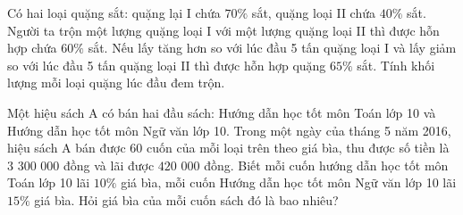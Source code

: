 \begin{bt}
	Có hai loại quặng sắt: quặng lại I chứa $70\%$ sắt, quặng loại II chứa $40\%$ sắt. Người ta trộn một lượng quặng loại I với một lượng quặng loại II thì được hỗn hợp chứa $60\%$ sắt. Nếu lấy tăng hơn so với lúc đầu 5 tấn quặng loại I và lấy giảm so với lúc đầu 5 tấn quặng loại II thì được hỗn hợp quặng $65\%$ sắt. Tính khối lượng mỗi loại quặng lúc đầu đem trộn.
\end{bt}

\begin{bt}%
Một hiệu sách A có bán hai đầu sách: Hướng dẫn học tốt môn Toán lớp 10 và Hướng dẫn học tốt môn Ngữ văn lớp 10. Trong một ngày của tháng 5 năm 2016, hiệu sách A bán được $60$ cuốn của mỗi loại trên theo giá bìa, thu được số tiền là $3$ $300$ $000$ đồng và lãi được $420$ $000$ đồng. Biết mỗi cuốn hướng dẫn học tốt môn Toán lớp 10 lãi $10\%$ giá bìa, mỗi cuốn Hướng dẫn học tốt môn Ngữ văn lớp 10 lãi $15\%$ giá bìa. Hỏi giá bìa của mỗi cuốn sách đó là bao nhiêu?
\end{bt}

